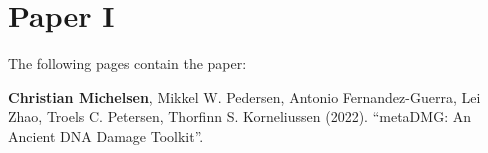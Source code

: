 \chapter{Paper I}
\label{chapter:metadmg}

The following pages contain the paper:
\vspace*{1cm}


\textbf{Christian Michelsen}, Mikkel W. Pedersen, Antonio Fernandez-Guerra, Lei Zhao, Troels C. Petersen, Thorfinn S. Korneliussen (2022). ``metaDMG: An Ancient DNA Damage Toolkit''.

\clearpage



